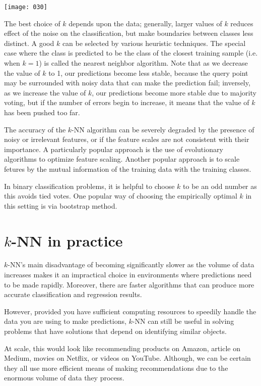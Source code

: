 \begin{center}
    \texttt{[image: 030]}
    \label{fig:030}
\end{center}

The best choice of \(k\) depends upon the data; generally, larger values of \(k\) reduces effect of the noise on the classification, but make boundaries between classes less distinct. A good \(k\) can be selected by various heuristic techniques. The special case where the class is predicted to be the class of the closest training sample (i.e. when \(k=1\)) is called the nearest neighbor algorithm. Note that as we decrease the value of \(k\) to 1, our predictions become less stable, because the query point may be surrounded with noisy data that can make the prediction fail; inversely, as we increase the value of \(k\), our predictions become more stable due to majority voting, but if the number of errors begin to increase, it means that the value of \(k\) has been pushed too far.

The accuracy of the \(k\)-NN algorithm can be severely degraded by the presence of noisy or irrelevant features, or if the feature scales are not consistent with their importance. A particularly popular approach is the use of evolutionary algorithms to optimize feature scaling. Another popular approach is to scale fetures by the mutual information of the training data with the training classes. 

In binary classification problems, it is helpful to choose \(k\) to be an odd number as this avoids tied votes. One popular way of choosing the empirically optimal \(k\) in this setting is via bootstrap method.

\section{\(k\)-NN in practice}
\(k\)-NN's main disadvantage of becoming significantly slower as the volume of data increases makes it an impractical choice in environments where predictions need to be made rapidly. Moreover, there are faster algorithms that can produce more accurate classification and regression results.

However, provided you have sufficient computing resources to speedily handle the data you are using to make predictions, \(k\)-NN can still be useful in solving problems that have solutions that depend on identifying similar objects. 

At scale, this would look like recommending products on Amazon, article on Medium, movies on Netflix, or videos on YouTube. Although, we can be certain they all use more efficient means of making recommendations due to the enormous volume of data they process.

